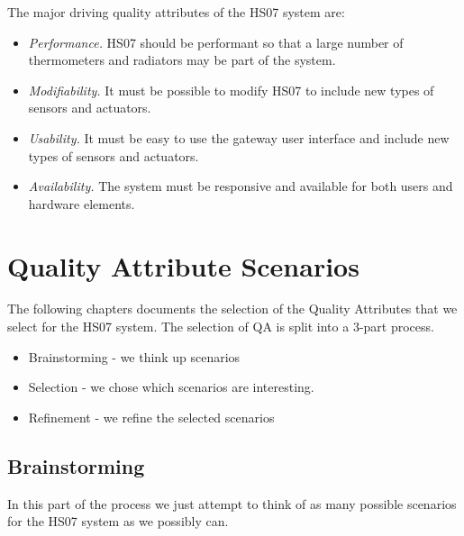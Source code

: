 \documentclass[a4paper,10pt]{article}
\begin{document}
The major driving quality attributes of the HS07 system
are:

\begin{itemize}
\item \emph{Performance.} HS07 should be performant so that a large
  number of thermometers and radiators may be part of the system.
\item \emph{Modifiability.} It must be possible to modify HS07 to
  include new types of sensors and actuators.
\item \emph{Usability.} It must be easy to use the gateway user interface
  and include new types of sensors and actuators.
\item \emph{Availability.} The system must be responsive and available for 
both users and hardware elements.
\end{itemize}




\section{Quality Attribute Scenarios}
The following chapters documents the selection of the Quality Attributes that we 
select for the HS07 system. The selection of QA is split into a 3-part process.
\begin{itemize}
\item Brainstorming - we think up scenarios
\item Selection - we chose which scenarios are interesting.
\item Refinement - we refine the selected scenarios
\end{itemize}

\subsection{Brainstorming}
In this part of the process we just attempt to think of as many possible scenarios for the HS07 system as we possibly can. 
\end{document}
